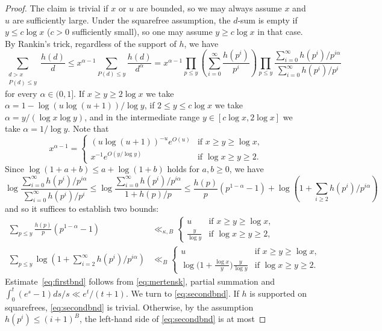 \documentclass{article}
\theoremstyle{plain}
\theoremstyle{remark}
\numberwithin{equation}{section}
\begin{document}
\begin{proof}
	The claim is trivial if $x$ or $u$ are bounded, so we may always assume $x$ and $u$ are sufficiently large.  Under the squarefree assumption, the $d$-sum is empty if $y\le c\log x$ ($c>0$ sufficiently small), so one may assume $y \ge c\log x$ in that case. 
	By Rankin's trick, regardless of the support of $h$, we have
	\[\sum_{\substack{d>x\\ P(d)\le y}} \frac{h(d)}{d} \le x^{\alpha-1} \sum_{P(d)\le y} \frac{h(d)}{d^{\alpha}} = x^{\alpha-1}\prod_{p\le y}\left(\sum_{i=0}^{\infty}\frac{h(p^i)}{p^i}\right)\prod_{p\le y} \frac{\sum_{i=0}^{\infty}h(p^i)/p^{i\alpha}}{\sum_{i=0}^{\infty}h(p^i)/p^i}\]
	for every $\alpha \in (0,1]$. If $x\ge y\ge 2\log x$ we take $\alpha =1-\log(u\log(u+1))/\log y$, if $2\le y\le c\log x$ we take $\alpha=y/(\log x \log y)$, and in the intermediate range $y \in [c\log x, 2\log x]$ we take $\alpha = 1/\log y$. Note that
	\[ x^{\alpha-1} = \begin{cases} (u \log (u+1))^{-u} e^{O(u)} &\text{if }x \ge y \ge \log x, \\ x^{-1} e^{O(y/\log y)} &\text{if }\log x \ge y \ge 2.\end{cases}\]
	Since $\log(1+a+b)\le a +\log(1+b)$ holds for $a,b\ge 0$, we have
	\[ \log  \frac{\sum_{i=0}^{\infty}h(p^i)/p^{i\alpha}}{\sum_{i=0}^{\infty}h(p^i)/p^i}\le  \log  \frac{\sum_{i=0}^{\infty}h(p^i)/p^{i\alpha}}{1+h(p)/p}\le \frac{h(p)}{p}(p^{1-\alpha}-1)+\log(1+ \sum_{i\ge 2}h(p^i)/p^{i\alpha})\]
	and so it suffices to establish two bounds:
	\begin{align}
		\label{eq:firstbnd}
		\sum_{p\le y}  \frac{h(p)}{p}(p^{1-\alpha}-1) &\ll_{\kappa,B} \begin{cases} u &\text{if }x\ge y\ge \log x,\\ \frac{y}{\log y}&\text{if }\log x \ge y \ge 2,\end{cases}\\
		\label{eq:secondbnd} \sum_{p\le y} \log(1+\sum_{i=2}^{\infty}h(p^i)/p^{i\alpha})&\ll_{B} \begin{cases} u& \text{if }x \ge y \ge \log x, \\ 
			\log\big( 1+\frac{\log x}{y}\big)	\frac{y}{\log y} &\text{if }\log x \ge y \ge 2.\end{cases}
	\end{align}
	Estimate~\eqref{eq:firstbnd} follows from \eqref{eq:mertensk}, partial summation and $\int_{0}^t (e^s-1)ds/s \ll e^t/(t+1)$. We turn to \eqref{eq:secondbnd}. If $h$ is supported on squarefrees, \eqref{eq:secondbnd} is trivial. Otherwise, by the assumption $h(p^i)\le (i+1)^B$, the left-hand side of \eqref{eq:secondbnd} is at most 

\end{proof}
\end{document}
